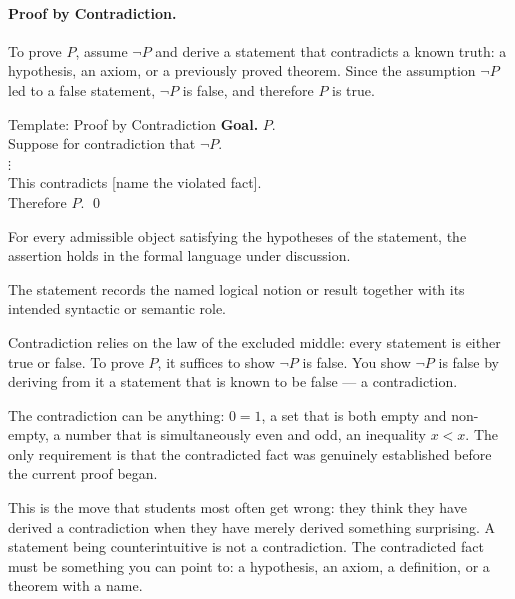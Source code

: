 \paragraph{Proof by Contradiction.}

To prove $P$, assume $\neg P$ and derive a statement that contradicts
a known truth: a hypothesis, an axiom, or a previously proved theorem.
Since the assumption $\neg P$ led to a false statement, $\neg P$ is
false, and therefore $P$ is true.

\begin{propositionbox}{Template: Proof by Contradiction}
\textbf{Goal.} $P$.\\[4pt]
Suppose for contradiction that $\neg P$.\\
$\vdots$ \\
This contradicts [name the violated fact].\\
Therefore $P$. \qed
\end{propositionbox}
\begin{remark*}
For every admissible object satisfying the hypotheses of the statement, the
assertion holds in the formal language under discussion.
\end{remark*}

\begin{remark*}[Interpretation]
The statement records the named logical notion or result together with its
intended syntactic or semantic role.
\end{remark*}


\begin{remark}
Contradiction relies on the law of the excluded middle: every statement
is either true or false. To prove $P$, it suffices to show $\neg P$
is false. You show $\neg P$ is false by deriving from it a statement
that is known to be false --- a contradiction.

The contradiction can be anything: $0 = 1$, a set that is both empty
and non-empty, a number that is simultaneously even and odd, an
inequality $x < x$. The only requirement is that the contradicted fact
was genuinely established before the current proof began.

This is the move that students most often get wrong: they think they
have derived a contradiction when they have merely derived something
surprising. A statement being counterintuitive is not a contradiction.
The contradicted fact must be something you can point to:
a hypothesis, an axiom, a definition, or a theorem with a name.
\end{remark}

